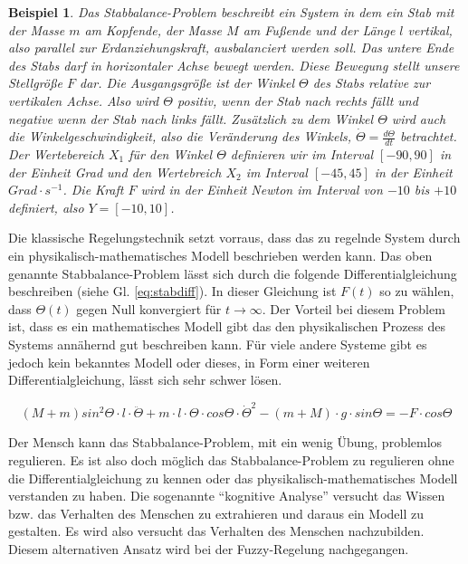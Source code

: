 \documentclass[12pt,a4paper,bibliography=totocnumbered,listof=totocnumbered]{scrartcl}
\theoremstyle{Umgebung}
\begin{document}
\newtheorem{stabbalance}{Beispiel}
\begin{stabbalance} 
	Das Stabbalance-Problem beschreibt ein System in dem ein Stab mit der Masse $m$ am Kopfende, der Masse $M$ am Fußende und der Länge $l$ vertikal, also parallel zur Erdanziehungskraft, ausbalanciert werden soll. Das untere Ende des Stabs darf in horizontaler Achse bewegt werden. Diese Bewegung stellt unsere Stellgröße $F$ dar. Die Ausgangsgröße ist der Winkel $\Theta$ des Stabs relative zur vertikalen Achse. Also wird $\Theta$ positiv, wenn der Stab nach rechts fällt und negative wenn der Stab nach links fällt. Zusätzlich zu dem Winkel $\Theta$ wird auch die Winkelgeschwindigkeit, also die Veränderung des Winkels, $\dot{\Theta} = \frac{d\Theta}{dt}$ betrachtet. Der Wertebereich $X_1$ für den Winkel $\Theta$ definieren wir im Interval $\left[-90,90\right]$ in der Einheit Grad und den Wertebreich $X_2$ im Interval $\left[-45, 45\right]$ in der Einheit $Grad \cdot s^{-1}$. Die Kraft $F$ wird in der Einheit Newton im Interval von $-10$ bis $+10$ definiert, also $Y=\left[-10, 10\right]$.
\end{stabbalance}

Die klassische Regelungstechnik setzt vorraus, dass das zu regelnde System durch ein physikalisch-mathematisches Modell beschrieben werden kann. Das oben genannte Stabbalance-Problem lässt sich durch die folgende Differentialgleichung beschreiben (siehe Gl. \ref{eq:stabdiff}). In dieser Gleichung ist $F(t)$ so zu wählen, dass $\Theta(t)$ gegen Null konvergiert für $t \rightarrow \infty$. Der Vorteil bei diesem Problem ist, dass es ein mathematisches Modell gibt das den physikalischen Prozess des Systems annähernd gut beschreiben kann. Für viele andere Systeme gibt es jedoch kein bekanntes Modell oder dieses, in Form einer weiteren Differentialgleichung, lässt sich sehr schwer lösen.

\label{eq:stabdiff}
\begin{equation}
(M+m)sin^2 \Theta \cdot l \cdot \ddot{\Theta} + m \cdot l \cdot \Theta \cdot cos\Theta \cdot \dot{\Theta}^2 - (m + M) \cdot g \cdot sin \Theta = -F \cdot cos \Theta
\end{equation}

Der Mensch kann das Stabbalance-Problem, mit ein wenig Übung, problemlos regulieren. Es ist also doch möglich das Stabbalance-Problem zu regulieren ohne die Differentialgleichung zu kennen oder das physikalisch-mathematisches Modell verstanden zu haben. Die sogenannte \enquote{kognitive Analyse} versucht das Wissen bzw. das Verhalten des Menschen zu extrahieren und daraus ein Modell zu gestalten. Es wird also versucht das Verhalten des Menschen nachzubilden. Diesem alternativen Ansatz wird bei der Fuzzy-Regelung nachgegangen.
\end{document}
